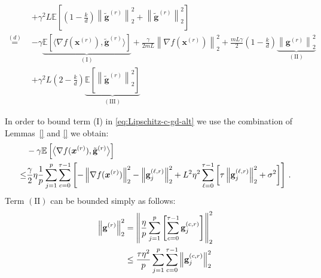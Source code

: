 \documentclass[review,onefignum,onetabnum]{siamart190516}
\begin{document}
\begin{equation}
\begin{split}
    \qquad&+{\gamma^2 L}\mathbb{E}\left[\left(1-\frac{k}{d}\right)\left\|\tilde{\mathbf{g}}^{(r)}\right\|_2^2+\left\|\tilde{\mathbf{g}}^{(r)}\right\|_2^2\right]\nonumber\\
    \stackrel{(d)}{=}& -\gamma\underbrace{\mathbb{E}\left[ \big\langle\nabla f({\boldsymbol{x}}^{(r)}),\tilde{\mathbf{g}}^{(r)}\big\rangle\right]}_{(\mathrm{I})}+ \frac{\gamma}{2mL}\left\|\nabla f({\boldsymbol{x}}^{(r)})\right\|^2_2+\frac{mL\gamma}{2}\left(1-\frac{k}{d}\right)\underbrace{\left\|{\mathbf{g}}^{(r)}\right\|^2_2}_{(\mathrm{II})}\\
    \qquad & +{\gamma^2 L}\left(2-\frac{k}{d}\right)\underbrace{\mathbb{E}\left[\left\|\tilde{\mathbf{g}}^{(r)}\right\|_2^2\right]}_{(\mathrm{III})}
\end{split}
\end{equation}

In order to bound term ($\mathrm{I}$) in \eqref{eq:Lipschitz-c-gd-alt} we use the combination of Lemmas~\ref{} and \ref{} we obtain:
\begin{equation}\notag
\begin{split}
    &-\gamma\mathbb{E}\left[ \big\langle\nabla f({\boldsymbol{x}}^{(r)}),\tilde{\mathbf{g}}^{(r)}\big\rangle\right]\\
    \leq&  \frac{\gamma}{2}\eta\frac{1}{p}\sum_{j=1}^p\sum_{c=0}^{\tau-1}\left[-\left\|\nabla f({\boldsymbol{x}}^{(r)})\right\|_2^2-\left\|\mathbf{g}_j^{(\ell,r)}\right\|_2^2+L^2\eta^2\sum_{\ell=0}^{\tau-1}\left[\tau\left\|{\mathbf{g}}_j^{(\ell,r)}\right\|_2^2+\sigma^2\right]\right] \, .
\end{split}
\end{equation}
Term $(\mathrm{II})$ can be bounded simply as follows:
\begin{align}\notag
    \left\|{\mathbf{g}}^{(r)}\right\|^2_2&=\left\|\frac{\eta}{p}\sum_{j=1}^{p}\left[\sum_{c=0}^{\tau-1}{\mathbf{g}}_j^{(c,r)}\right]\right\|^2_2\nonumber\\
    &\leq\frac{\tau\eta^2}{p}\sum_{j=1}^{p}\sum_{c=0}^{\tau-1}\left\|\mathbf{g}_j^{(c,r)}\right\|^2_2
\end{align}
\end{document}
